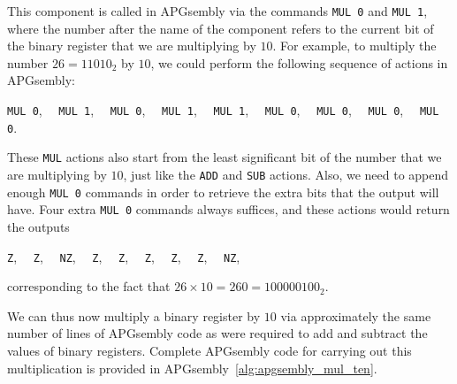 This component is called in APGsembly via the commands \texttt{MUL 0} and \texttt{MUL 1}, where the number after the name of the component refers to the current bit of the binary register that we are multiplying by $10$. For example, to multiply the number $26 = 11010_2$ by $10$, we could perform the following sequence of actions in APGsembly:
\begin{center}
	\texttt{MUL 0}, \ \ \texttt{MUL 1}, \ \ \texttt{MUL 0}, \ \ \texttt{MUL 1}, \ \ \texttt{MUL 1}, \ \ \texttt{MUL 0}, \ \ \texttt{MUL 0}, \ \ \texttt{MUL 0}, \ \ \texttt{MUL 0}.
\end{center}
These \texttt{MUL} actions also start from the least significant bit of the number that we are multiplying by $10$, just like the \texttt{ADD} and \texttt{SUB} actions. Also, we need to append enough \texttt{MUL 0} commands in order to retrieve the extra bits that the output will have. Four extra \texttt{MUL 0} commands always suffices, and these actions would return the outputs
\begin{center}
	\leavevmode{}\texttt{Z}, \ \ \texttt{Z}, \ \ \texttt{NZ}, \ \ \texttt{Z}, \ \ \texttt{Z}, \ \ \texttt{Z}, \ \ \texttt{Z}, \ \ \texttt{Z}, \ \ \texttt{NZ},
\end{center}
corresponding to the fact that $26 \times 10 = 260 = 100000100_2$.

We can thus now multiply a binary register by $10$ via approximately the same number of lines of APGsembly code as were required to add and subtract the values of binary registers. Complete APGsembly code for carrying out this multiplication is provided in APGsembly~\ref{alg:apgsembly_mul_ten}.

